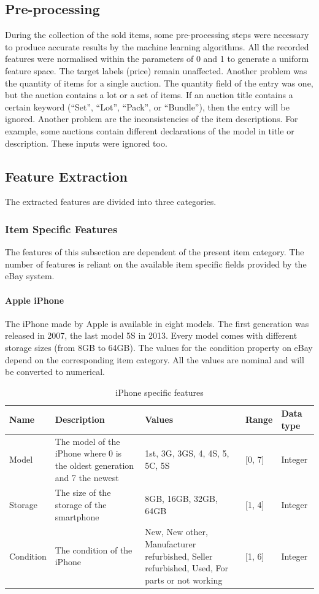 \subsection{Pre-processing}
During the collection of the sold items, some pre-processing steps were necessary to produce accurate results by the machine learning algorithms. All the recorded features were normalised within the parameters of 0 and 1 to generate a uniform feature space. The target labels (price) remain unaffected. 
Another problem was the quantity of items for a single auction. The quantity field of the entry was one, but the auction contains a lot or a set of items. If an auction title contains a certain keyword (``Set'', ``Lot'', ``Pack'', or ``Bundle''), then the entry will be ignored.
Another problem are the inconsistencies of the item descriptions. For example, some auctions contain different declarations of the model in title or description. These inputs were ignored too.
\subsection{Feature Extraction}
The extracted features are divided into three categories.
\subsubsection{Item Specific Features}
The features of this subsection are dependent of the present item category. The number of features is reliant on the available item specific fields provided by the eBay system.
\paragraph{Apple iPhone}
The iPhone made by Apple is available in eight models. The first generation was released in 2007, the last model 5S in 2013. Every model comes with different storage sizes (from 8GB to 64GB). The values for the condition property on eBay depend on the corresponding item category. All the values are nominal and will be converted to numerical.
\begin{table}[h!]
	\begin{center}
	\begin{tabular}{| p{2.6cm} | p{2.6cm} | p{2.6cm} | p{2.6cm} | p{2.6cm} |}
		\hline
		\textbf{Name} & \textbf{Description} & \textbf{Values} & \textbf{Range} & \textbf{Data type} \\
		\hline
		Model & The model of the iPhone where 0 is the oldest generation and 7 the newest & 1st, 3G, 3GS, 4, 4S, 5, 5C, 5S & [0, 7] & Integer \\
		\hline
		Storage & The size of the storage of the smartphone & 8GB, 16GB, 32GB, 64GB & [1, 4] & Integer \\
		\hline
		Condition & The condition of the iPhone & New, New other, Manufacturer refurbished, Seller refurbished, Used, For parts or not working & [1, 6] & Integer \\
		\hline
	\end{tabular}
	\end{center}
	\caption{iPhone specific features}
\end{table}

